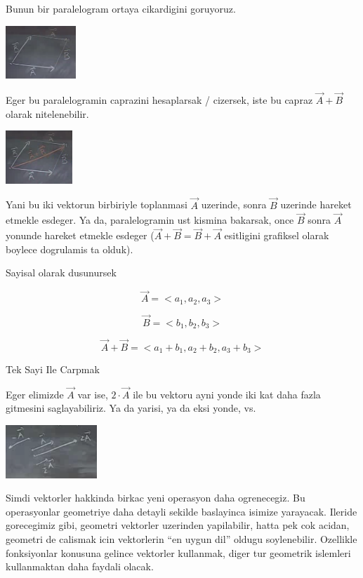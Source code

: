 \documentclass[12pt,fleqn]{article}\usepackage{../common}
\begin{document}
Bunun bir paralelogram ortaya cikardigini goruyoruz. 

\includegraphics[height=2cm]{1_8.png}

Eger bu paralelogramin caprazini hesaplarsak / cizersek, iste bu capraz
$\vec{A} + \vec{B}$ olarak nitelenebilir. 

\includegraphics[height=2cm]{1_9.png}

Yani bu iki vektorun birbiriyle toplanmasi $\vec{A}$ uzerinde, sonra
$\vec{B}$ uzerinde hareket etmekle esdeger. Ya da, paralelogramin ust
kismina bakarsak, once $\vec{B}$ sonra $\vec{A}$ yonunde hareket etmekle
esdeger ($\vec{A} + \vec{B} = \vec{B} + \vec{A}$ esitligini grafiksel
olarak boylece dogrulamis ta olduk).

Sayisal olarak dusunursek

\[ \vec{A} = <a_1, a_2, a_3> \]

\[ \vec{B} = <b_1, b_2, b_3> \]

\[ \vec{A} + \vec{B} = <a_1+b_1, a_2+b_2, a_3+b_3> \]

Tek Sayi Ile Carpmak

Eger elimizde $\vec{A}$ var ise, $2 \cdot \vec{A}$ ile bu vektoru ayni
yonde iki kat daha fazla gitmesini saglayabiliriz. Ya da yarisi, ya da eksi
yonde, vs.

\includegraphics[height=2cm]{1_10.png}

Simdi vektorler hakkinda birkac yeni operasyon daha ogrenecegiz. Bu
operasyonlar geometriye daha detayli sekilde baslayinca isimize
yarayacak. Ileride gorecegimiz gibi, geometri vektorler uzerinden
yapilabilir, hatta pek cok acidan, geometri de calismak icin vektorlerin
``en uygun dil'' oldugu soylenebilir. Ozellikle fonksiyonlar konusuna
gelince vektorler kullanmak, diger tur geometrik islemleri kullanmaktan
daha faydali olacak. 
\end{document}
